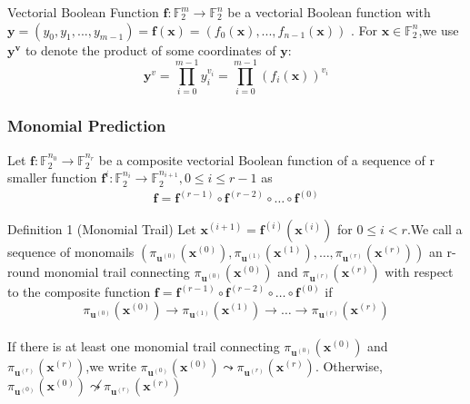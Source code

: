 \documentclass[notheorems,aspectratio=169]{beamer}
\def\bd#1{\boldsymbol{#1}}
\begin{document}
\begin{frame}

    
    \begin{block}{Vectorial Boolean Function }
        $\boldsymbol{f}:\mathbb{F}^m_2 \rightarrow \mathbb{F}^n_2 $  be a vectorial Boolean function with $\boldsymbol{y} =(y_0,y_1,...,y_{m-1})=\boldsymbol{f}(\boldsymbol{x})=(f_0(\boldsymbol{x}),...,f_{n-1}(\boldsymbol{x}))$ .
        For $\boldsymbol{x}\in \mathbb{F}^n_2 $,we use $\boldsymbol{y}^\boldsymbol{v}$ to denote the product of some coordinates of $\boldsymbol{y}$:
        $$ \boldsymbol{y}^v =\prod^{m-1}_{i=0}y_i^{v_i} =\prod ^{m-1}_{i=0}(f_i(\boldsymbol{x}))^{v_i}$$
    \end{block}
    

    
\end{frame}
\begin{frame}
    \frametitle{ Monomial Prediction}
    Let $\boldsymbol{f}:\mathbb{F}^{n_0}_2 \rightarrow \mathbb{F}^{n_r}_2$ be a composite vectorial Boolean function of a sequence of
    r smaller function $\boldsymbol{f}^i:\mathbb{F}^{n_i}_2 \rightarrow \mathbb{F}^{n_{i+1}}_2,0 \le i \le r-1$ as
    \begin{align}
        \boldsymbol{f}=\boldsymbol{f}^{(r-1)} \circ \boldsymbol{f}^{(r-2)} \circ \dots \circ \boldsymbol{f}^{(0)}
    \end{align}
    \begin{block}{Definition 1 (Monomial Trail)}
        Let $\bd{x}^{(i+1)}=\bd{f}^{(i)}(\bd{x}^{(i)})$ for $0\le i<r$.We call a sequence of monomails 
        $(\pi_{\boldsymbol{u}^{(0)}}(\boldsymbol{x}^{(0)}) , \pi_{\boldsymbol{u}^{(1)}}(\boldsymbol{x}^{(1)}) , \dots ,\pi_{\boldsymbol{u}^{(r)}}(\boldsymbol{x}^{(r)}))$
        an r-round monomial trail connecting $\pi_{\boldsymbol{u}^{(0)}}(\boldsymbol{x}^{(0)})$ and
        $\pi_{\boldsymbol{u}^{(r)}}(\boldsymbol{x}^{(r)})$ with respect to the composite function
        $\bd{f}=\bd{f}^{(r-1)}\circ \bd{f}^{(r-2)}\circ \dots \circ \bd{f}^{(0)}$ if
        $$
        \pi_{\boldsymbol{u}^{(0)}}(\boldsymbol{x}^{(0)}) \rightarrow \pi_{\boldsymbol{u}^{(1)}}(\boldsymbol{x}^{(1)}) \rightarrow \dots \rightarrow \pi_{\boldsymbol{u}^{(r)}}(\boldsymbol{x}^{(r)})
        $$
        \\
        If there is at least one monomial trail connecting $\pi_{\boldsymbol{u}^{(0)}}(\boldsymbol{x}^{(0)})$
        and $\pi_{\boldsymbol{u}^{(r)}}(\boldsymbol{x}^{(r)})$,we write 
        $\pi_{\boldsymbol{u}^{(0)}}(\boldsymbol{x}^{(0)})\leadsto \pi_{\boldsymbol{u}^{(r)}}(\boldsymbol{x}^{(r)})$.
        Otherwise,$\pi_{\boldsymbol{u}^{(0)}}(\boldsymbol{x}^{(0)})\not \leadsto \pi_{\boldsymbol{u}^{(r)}}(\boldsymbol{x}^{(r)})$
    \end{block}
\end{frame}
\end{document}
